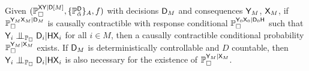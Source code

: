 \begin{theorem}\label{lem:proxy_control}
Given $(\mathbb{P}_\square^{\mathsf{XY}|\mathsf{D}[M]},\{\mathbb{P}_{\tilde{\alpha}}^{\mathsf{D}}\}_A,f)$ with decisions $\mathsf{D}_M$ and consequences $\mathsf{Y}_M$, $\mathsf{X}_M$, if $\mathbb{P}_\square^{\mathsf{Y}_M\mathsf{X}_M|\mathsf{D}_M}$ is causally contractible with response conditional $\mathbb{P}_\square^{\mathsf{Y}_0\mathsf{X}_0|\mathsf{D}_0\mathsf{H}}$ such that $\RV{Y}_i\CI_{\prob{P}_\square} \RV{D}_i|\RV{HX}_i$ for all $i\in M$, then a causally contractible conditional probability $\mathbb{P}_\square^{\mathsf{Y}_M|\mathsf{X}_M}$ exists. If $\mathsf{D}_M$ is deterministically controllable and $D$ countable, then $\RV{Y}_i\CI_{\prob{P}_\square} \RV{D}_i|\RV{HX}_i$ is also necessary for the existence of $\mathbb{P}_\square^{\mathsf{Y}_M|\mathsf{X}_M}$.
\end{theorem}

